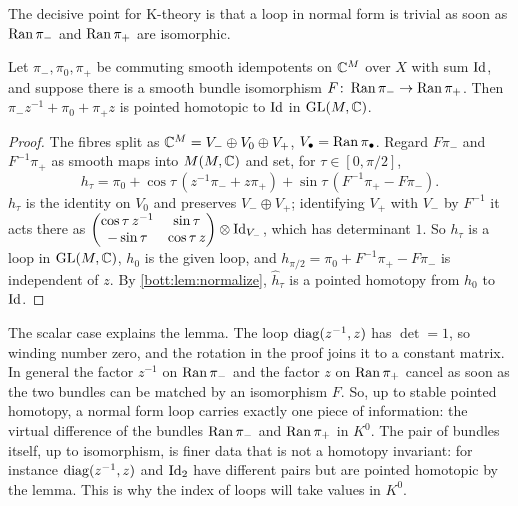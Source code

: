The decisive point for K-theory is that a loop in normal form is trivial as soon as
$\operatorname{Ran}\pi_-$ and $\operatorname{Ran}\pi_+$ are isomorphic.

\begin{lemma}\label{bott:lem:normal-trivial}
  Let $\pi_-,\pi_0,\pi_+$ be commuting smooth idempotents on $\mathbb{C}^M$ over $X$ with
  sum $\operatorname{Id}$, and suppose there is a smooth bundle isomorphism
  $F\colon\operatorname{Ran}\pi_-\to\operatorname{Ran}\pi_+$. Then $\pi_-z^{-1}+\pi_0+\pi_+z$ is pointed homotopic
  to $\operatorname{Id}$ in $\operatorname{GL}(M,\mathbb{C})$.
\end{lemma}
\begin{proof}
  The fibres split as $\mathbb{C}^M=V_-\oplus V_0\oplus V_+$, $V_\bullet=\operatorname{Ran}\pi_\bullet$.
  Regard $F\pi_-$ and $F^{-1}\pi_+$ as smooth maps into $M(M,\mathbb{C})$ and set, for
  $\tau\in[0,\pi/2]$,
  \begin{equation*}
    h_\tau=\pi_0+\cos\tau\,(z^{-1}\pi_-+z\pi_+)+\sin\tau\,(F^{-1}\pi_+-F\pi_-).
  \end{equation*}
  $h_\tau$ is the identity on $V_0$ and preserves $V_-\oplus V_+$; identifying $V_+$ with
  $V_-$ by $F^{-1}$ it acts there as
  $\begin{pmatrix}\cos\tau\,z^{-1}&\sin\tau\\-\sin\tau&\cos\tau\,z\end{pmatrix}\otimes\operatorname{Id}_{V_-}$,
  which has determinant $1$. So $h_\tau$ is a loop in $\operatorname{GL}(M,\mathbb{C})$, $h_0$ is the given
  loop, and $h_{\pi/2}=\pi_0+F^{-1}\pi_+-F\pi_-$ is independent of $z$. By
  \cref{bott:lem:normalize}, $\hat h_\tau$ is a pointed homotopy from $h_0$ to $\operatorname{Id}$.
\end{proof}

\begin{discussion}
  The scalar case explains the lemma. The loop $\operatorname{diag}(z^{-1},z)$ has
  $\det=1$, so winding number zero, and the rotation in the proof joins it to a
  constant matrix. In general the factor $z^{-1}$ on $\operatorname{Ran}\pi_-$ and the factor $z$
  on $\operatorname{Ran}\pi_+$ cancel as soon as the two bundles can be matched by an
  isomorphism $F$. So, up to stable pointed homotopy, a normal form loop
  carries exactly one piece of information: the virtual difference of the
  bundles $\operatorname{Ran}\pi_-$ and $\operatorname{Ran}\pi_+$ in $K^0$. The pair of bundles itself,
  up to isomorphism, is finer data that is not a homotopy invariant: for
  instance $\operatorname{diag}(z^{-1},z)$ and $\operatorname{Id}_2$ have different pairs but are pointed
  homotopic by the lemma. This is why the index of loops will take values in
  $K^0$.
\end{discussion}

